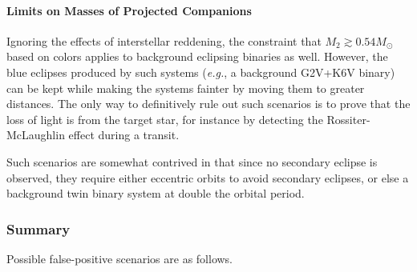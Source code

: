 \documentclass[12pt,twocolumn,tighten]{aastex62}
\begin{document}
\paragraph{Limits on Masses of Projected Companions}

Ignoring the effects of interstellar reddening,
the constraint that $M_2 \gtrsim 0.54 M_\odot$ based on
colors applies to background eclipsing binaries as well.
However, the blue eclipses produced by such systems ({\it e.g.}, a background G2V+K6V binary)
can be kept while making the systems fainter by moving them to greater
distances.
The only way to definitively rule out such scenarios is to 
prove that the loss of light is from the target star,
for instance by detecting the Rossiter-McLaughlin effect
during a transit.

Such scenarios are somewhat contrived in that since 
no secondary eclipse is observed, they require either
eccentric orbits to avoid secondary eclipses, or else a
background twin binary system at double
the orbital period.


\newpage
\subsubsection{Summary}

Possible false-positive scenarios are as follows.
\end{document}
